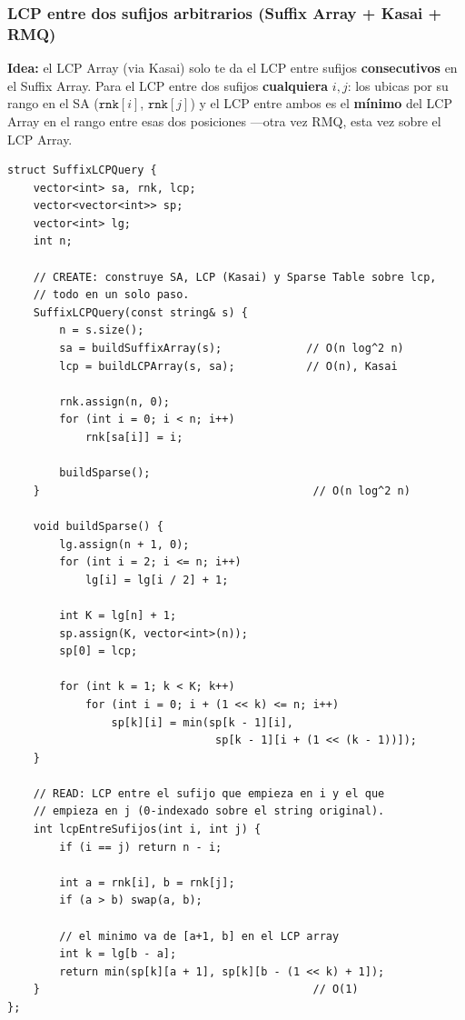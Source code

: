 \documentclass[10pt,a4paper,twocolumn]{article}
\begin{document}
\subsubsection{LCP entre dos sufijos arbitrarios (Suffix Array + Kasai + RMQ)}

\textbf{Idea:} el LCP Array (via Kasai) solo te da el LCP entre
sufijos \textbf{consecutivos} en el Suffix Array. Para el LCP entre
dos sufijos \textbf{cualquiera} $i,j$: los ubicas por su rango en el
SA ($\texttt{rnk}[i]$, $\texttt{rnk}[j]$) y el LCP entre ambos es el
\textbf{mínimo} del LCP Array en el rango entre esas dos posiciones
—otra vez RMQ, esta vez sobre el LCP Array.

\begin{lstlisting}[style=cpp]
struct SuffixLCPQuery {
    vector<int> sa, rnk, lcp;
    vector<vector<int>> sp;
    vector<int> lg;
    int n;

    // CREATE: construye SA, LCP (Kasai) y Sparse Table sobre lcp,
    // todo en un solo paso.
    SuffixLCPQuery(const string& s) {
        n = s.size();
        sa = buildSuffixArray(s);             // O(n log^2 n)
        lcp = buildLCPArray(s, sa);           // O(n), Kasai

        rnk.assign(n, 0);
        for (int i = 0; i < n; i++)
            rnk[sa[i]] = i;

        buildSparse();
    }                                          // O(n log^2 n)

    void buildSparse() {
        lg.assign(n + 1, 0);
        for (int i = 2; i <= n; i++)
            lg[i] = lg[i / 2] + 1;

        int K = lg[n] + 1;
        sp.assign(K, vector<int>(n));
        sp[0] = lcp;

        for (int k = 1; k < K; k++)
            for (int i = 0; i + (1 << k) <= n; i++)
                sp[k][i] = min(sp[k - 1][i],
                                sp[k - 1][i + (1 << (k - 1))]);
    }

    // READ: LCP entre el sufijo que empieza en i y el que
    // empieza en j (0-indexado sobre el string original).
    int lcpEntreSufijos(int i, int j) {
        if (i == j) return n - i;

        int a = rnk[i], b = rnk[j];
        if (a > b) swap(a, b);

        // el minimo va de [a+1, b] en el LCP array
        int k = lg[b - a];
        return min(sp[k][a + 1], sp[k][b - (1 << k) + 1]);
    }                                          // O(1)
};
\end{lstlisting}
\end{document}
